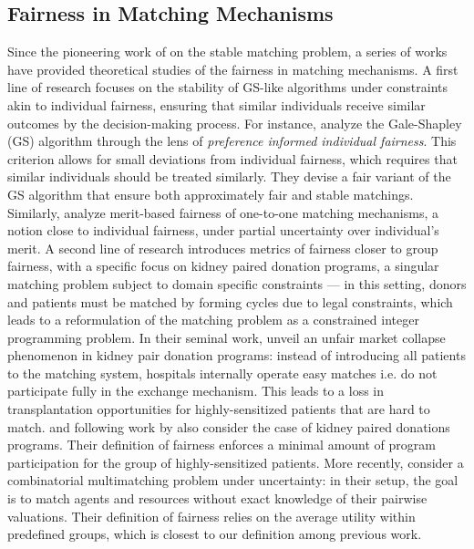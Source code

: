 \documentclass{article}
\theoremstyle{definition}
\begin{document}
\subsection{Fairness in Matching Mechanisms} Since the pioneering work of \citet{gale1962college} on the stable matching problem, a series of works have provided theoretical studies of the fairness in matching mechanisms. A first line of research focuses on the stability of GS-like algorithms under constraints akin to individual fairness, ensuring that similar individuals receive similar outcomes by the decision-making process. For instance, \citet{karni2021fairness} analyze the Gale-Shapley (GS) algorithm through the lens of \textit{preference informed individual fairness}. This criterion allows for small deviations from individual fairness, which requires that similar individuals should be treated similarly. They devise a fair variant of the GS algorithm that ensure both approximately fair and stable matchings. Similarly, \citet{devic2023fairness} analyze merit-based fairness of one-to-one matching mechanisms, a notion close to individual fairness, under partial uncertainty over individual's merit. A second line of research introduces metrics of fairness closer to group fairness, with a specific focus on kidney paired donation programs, a singular matching problem subject to domain specific constraints --- in this setting, donors and patients must be matched by forming cycles due to legal constraints, which leads to a reformulation of the matching problem as a constrained integer programming problem. In their seminal work, \citet{ashlagi2014free} unveil an unfair market collapse phenomenon in kidney pair donation programs: instead of introducing all patients to the matching system, hospitals internally operate easy matches i.e. do not participate fully in the exchange mechanism. This leads to a loss in transplantation opportunities for highly-sensitized patients that are hard to match. \citet{dickerson2014price} and following work by \citet{zhang2025fairness} also consider the case of kidney paired donations programs. Their definition of fairness enforces a minimal amount of program participation for the group of highly-sensitized patients. More recently, \citet{lobo2025fair} consider a combinatorial multimatching problem under uncertainty: in their setup, the goal is to match agents and resources without exact knowledge of their pairwise valuations. Their definition of fairness relies on the average utility within predefined groups, which is closest to our definition among previous work. 
\end{document}
